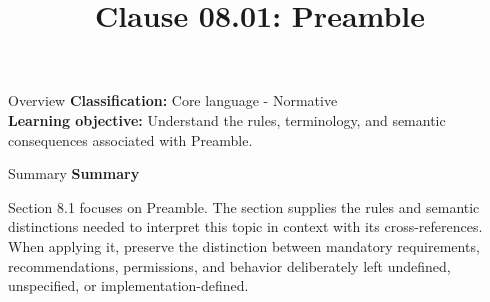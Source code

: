 \documentclass[10pt,letterpaper]{article}
\title{Clause 08.01: Preamble}
\author{}
\date{}
\begin{document}
\maketitle
\begin{CornellOverviewBox}{Overview}
\textbf{Classification:} Core language - Normative\\[2pt]
\textbf{Learning objective:} Understand the rules, terminology, and semantic consequences associated with Preamble.
\end{CornellOverviewBox}\begin{CornellSummaryBox}{Summary}
{\sffamily\bfseries\color{Accent} Summary}\par\vspace{3pt}Section 8.1 focuses on Preamble. The section supplies the rules and semantic distinctions needed to interpret this topic in context with its cross-references. When applying it, preserve the distinction between mandatory requirements, recommendations, permissions, and behavior deliberately left undefined, unspecified, or implementation-defined.
\end{CornellSummaryBox}
\end{document}

